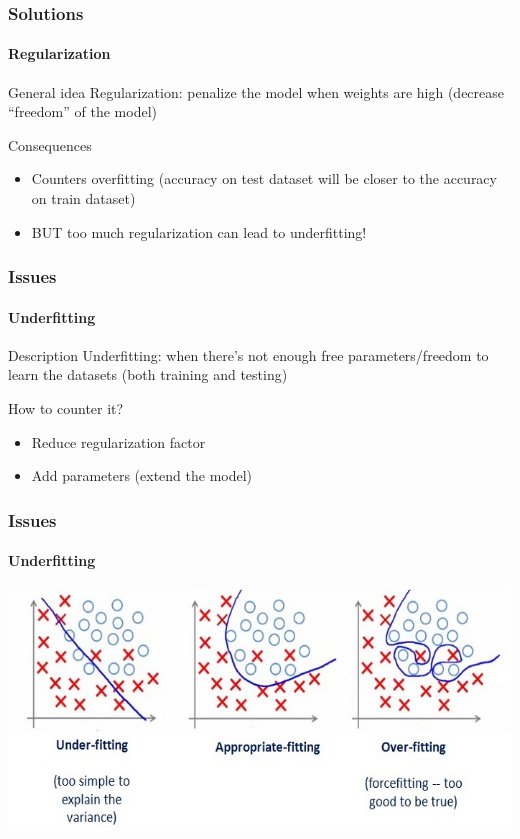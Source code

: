 \documentclass[]{beamer}
\begin{document}
\begin{frame}
  \frametitle{Solutions}
  \framesubtitle{Regularization}

  \begin{block}{General idea}
    Regularization: penalize the model when weights are high (decrease ``freedom'' of the model)
  \end{block}

  \begin{exampleblock}{Consequences}
    \begin{itemize}
      \item Counters overfitting (accuracy on test dataset will be closer to the accuracy on train dataset)
      \item \alert{BUT} too much regularization can lead to \alert{underfitting}!
    \end{itemize}
  \end{exampleblock}
\end{frame}

\begin{frame}
  \frametitle{Issues}
  \framesubtitle{Underfitting}

  \begin{block}{Description}
    Underfitting: when there's not enough free parameters/freedom to learn the datasets (both training and testing)
  \end{block}

  \begin{exampleblock}{How to counter it?}
    \begin{itemize}
      \item Reduce regularization factor
      \item Add parameters (extend the model)
    \end{itemize}
  \end{exampleblock}
\end{frame}

\begin{frame}
  \frametitle{Issues}
  \framesubtitle{Underfitting}
  \begin{center}
    \includegraphics[width=\linewidth]{resources/underfitting}
  \end{center}
\end{frame}
\end{document}
